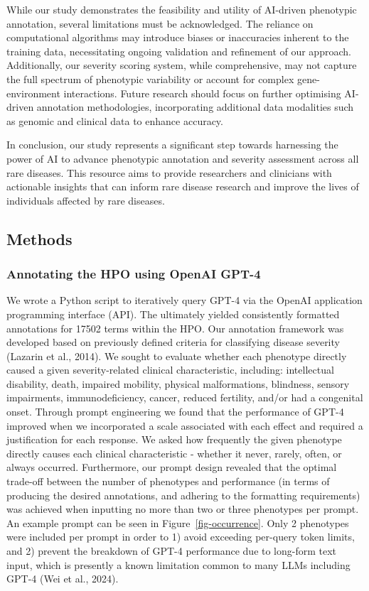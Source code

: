 \documentclass[
]{agujournal2019}
\begin{document}
While our study demonstrates the feasibility and utility of AI-driven
phenotypic annotation, several limitations must be acknowledged. The
reliance on computational algorithms may introduce biases or
inaccuracies inherent to the training data, necessitating ongoing
validation and refinement of our approach. Additionally, our severity
scoring system, while comprehensive, may not capture the full spectrum
of phenotypic variability or account for complex gene-environment
interactions. Future research should focus on further optimising
AI-driven annotation methodologies, incorporating additional data
modalities such as genomic and clinical data to enhance accuracy.

In conclusion, our study represents a significant step towards
harnessing the power of AI to advance phenotypic annotation and severity
assessment across all rare diseases. This resource aims to provide
researchers and clinicians with actionable insights that can inform rare
disease research and improve the lives of individuals affected by rare
diseases.

\subsection{Methods}\label{methods}

\subsubsection{Annotating the HPO using OpenAI
GPT-4}\label{annotating-the-hpo-using-openai-gpt-4}

We wrote a Python script to iteratively query GPT-4 via the OpenAI
application programming interface (API). The ultimately yielded
consistently formatted annotations for 17502 terms within the HPO. Our
annotation framework was developed based on previously defined criteria
for classifying disease severity (Lazarin et al., 2014). We sought to
evaluate whether each phenotype directly caused a given severity-related
clinical characteristic, including: intellectual disability, death,
impaired mobility, physical malformations, blindness, sensory
impairments, immunodeficiency, cancer, reduced fertility, and/or had a
congenital onset. Through prompt engineering we found that the
performance of GPT-4 improved when we incorporated a scale associated
with each effect and required a justification for each response. We
asked how frequently the given phenotype directly causes each clinical
characteristic - whether it never, rarely, often, or always occurred.
Furthermore, our prompt design revealed that the optimal trade-off
between the number of phenotypes and performance (in terms of producing
the desired annotations, and adhering to the formatting requirements)
was achieved when inputting no more than two or three phenotypes per
prompt. An example prompt can be seen in Figure~\ref{fig-occurrence}.
Only 2 phenotypes were included per prompt in order to 1) avoid
exceeding per-query token limits, and 2) prevent the breakdown of GPT-4
performance due to long-form text input, which is presently a known
limitation common to many LLMs including GPT-4 (Wei et al., 2024).
\end{document}
